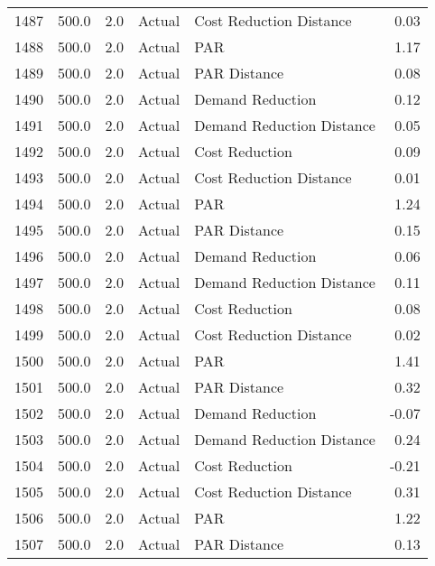 \begin{longtable}{lrrllr}
1487 &        500.0 &     2.0 &         Actual &    Cost Reduction Distance &   0.03 \\
1488 &        500.0 &     2.0 &         Actual &                        PAR &   1.17 \\
1489 &        500.0 &     2.0 &         Actual &               PAR Distance &   0.08 \\
1490 &        500.0 &     2.0 &         Actual &           Demand Reduction &   0.12 \\
1491 &        500.0 &     2.0 &         Actual &  Demand Reduction Distance &   0.05 \\
1492 &        500.0 &     2.0 &         Actual &             Cost Reduction &   0.09 \\
1493 &        500.0 &     2.0 &         Actual &    Cost Reduction Distance &   0.01 \\
1494 &        500.0 &     2.0 &         Actual &                        PAR &   1.24 \\
1495 &        500.0 &     2.0 &         Actual &               PAR Distance &   0.15 \\
1496 &        500.0 &     2.0 &         Actual &           Demand Reduction &   0.06 \\
1497 &        500.0 &     2.0 &         Actual &  Demand Reduction Distance &   0.11 \\
1498 &        500.0 &     2.0 &         Actual &             Cost Reduction &   0.08 \\
1499 &        500.0 &     2.0 &         Actual &    Cost Reduction Distance &   0.02 \\
1500 &        500.0 &     2.0 &         Actual &                        PAR &   1.41 \\
1501 &        500.0 &     2.0 &         Actual &               PAR Distance &   0.32 \\
1502 &        500.0 &     2.0 &         Actual &           Demand Reduction &  -0.07 \\
1503 &        500.0 &     2.0 &         Actual &  Demand Reduction Distance &   0.24 \\
1504 &        500.0 &     2.0 &         Actual &             Cost Reduction &  -0.21 \\
1505 &        500.0 &     2.0 &         Actual &    Cost Reduction Distance &   0.31 \\
1506 &        500.0 &     2.0 &         Actual &                        PAR &   1.22 \\
1507 &        500.0 &     2.0 &         Actual &               PAR Distance &   0.13 \\

\end{longtable}
